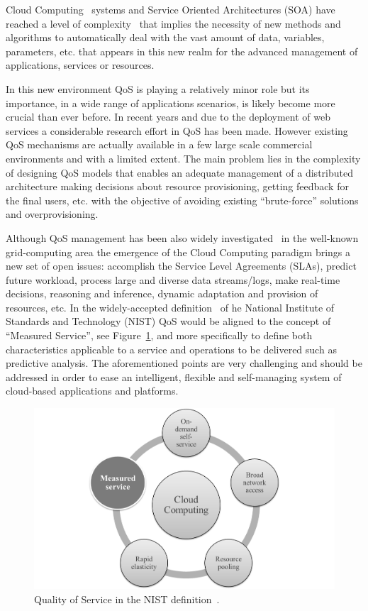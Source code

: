 Cloud Computing~\cite{mell2011nist} systems and Service Oriented Architectures (SOA) have 
reached a level of complexity~\cite{Huebscher:2008:SAC:1380584.1380585,Conejero:2012:MSQ:2357487.2357591} that implies the necessity of new methods 
and algorithms to automatically deal with the vast amount of data, variables, 
parameters, etc. that appears in this new realm for the advanced management of 
applications, services or resources. 

In this new environment QoS is playing a relatively minor role but its 
importance, in a wide range of applications scenarios, is likely become more 
crucial than ever before. In recent years and due to the deployment of web 
services a considerable research effort in QoS has been made. However existing 
QoS mechanisms are actually available in a few large scale commercial 
environments and with a limited extent. The main problem lies in the complexity 
of designing QoS models that enables an adequate management of a distributed 
architecture making decisions about resource provisioning, getting feedback for 
the final users, etc. with the objective of avoiding existing ``brute-force''
solutions and overprovisioning. 

Although QoS management has been also widely investigated~\cite{Conejero:2012:MSQ:2357487.2357591} 
in the well-known grid-computing area the emergence of the Cloud Computing paradigm 
brings a new set of open issues: accomplish the  Service Level Agreements (SLAs), predict 
future workload, process large and diverse data streams/logs, make real-time 
decisions, reasoning and inference, dynamic adaptation and provision of 
resources, etc. In the widely-accepted definition~\cite{mell2011nist} of 
he National Institute of Standards and Technology (NIST) QoS 
would be aligned to the concept of ``Measured Service'', see Figure~\ref{fig:qos-intro}, and 
more specifically to define both characteristics applicable to a service and operations 
to be delivered such as predictive analysis. 
The aforementioned points are very challenging and should be 
addressed in order to ease an intelligent, flexible and self-managing system of 
cloud-based applications and platforms.


 \begin{figure}[!ht]
\centering
	\includegraphics[width=12cm]{./imgs/qos-intro}
 \caption{Quality of Service in the NIST definition~\cite{mell2011nist}.}
 \label{fig:qos-intro}
\end{figure}

